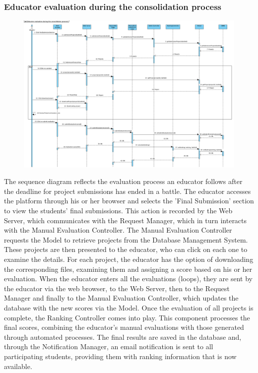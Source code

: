 \subsubsection{Educator evaluation during the consolidation process}
\begin{figure}[H]
    \centering
    \includegraphics[width=1\textwidth]{SequenceDiagram/ConsProcc.png}
    \label{fig:enter-label}
\end{figure}
The sequence diagram reflects the evaluation process an educator follows after the deadline for project submissions has ended in a battle. The educator accesses the platform through his or her browser and selects the 'Final Submission' section to view the students' final submissions. This action is recorded by the Web Server, which communicates with the Request Manager, which in turn interacts with the Manual Evaluation Controller.
The Manual Evaluation Controller requests the Model to retrieve projects from the Database Management System. These projects are then presented to the educator, who can click on each one to examine the details. For each project, the educator has the option of downloading the corresponding files, examining them and assigning a score based on his or her evaluation. When the educator enters all the evaluations (loops), they are sent by the educator via the web browser, to the Web Server, then to the Request Manager and finally to the Manual Evaluation Controller, which updates the database with the new scores via the Model.
Once the evaluation of all projects is complete, the Ranking Controller comes into play. This component processes the final scores, combining the educator's manual evaluations with those generated through automated processes. The final results are saved in the database and, through the Notification Manager, an email notification is sent to all participating students, providing them with ranking information that is now available.
